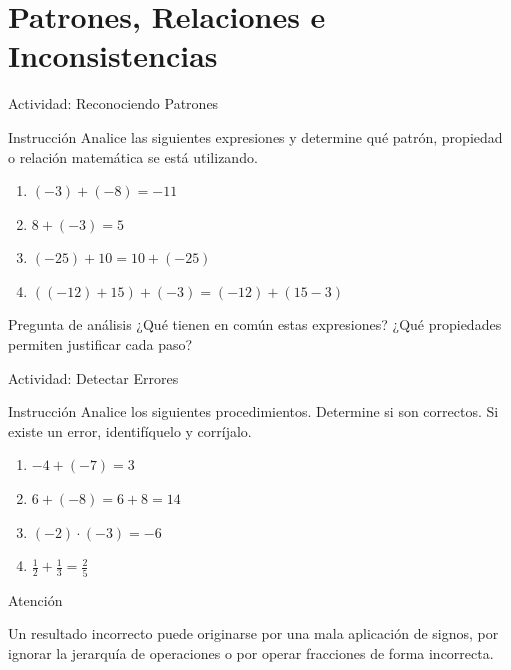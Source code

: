 \documentclass[handout,aspectratio=169,10pt]{beamer}
\newcommand{\AlertaPedagogica}[1]{
	\begin{alertblock}{Atención}
		#1
	\end{alertblock}
}
\begin{document}
	\section{Patrones, Relaciones e Inconsistencias}
	
	\begin{frame}{Actividad: Reconociendo Patrones}
		\begin{block}{Instrucción}
			Analice las siguientes expresiones y determine qué patrón, propiedad o relación matemática se está utilizando.
		\end{block}
		
		\begin{enumerate}[<+->]
			\item \((-3)+(-8)=-11\)
			\item \(8+(-3)=5\)
			\item \((-25)+10=10+(-25)\)
			\item \(((-12)+15)+(-3)=(-12)+(15-3)\)
		\end{enumerate}
		
		\begin{alertblock}{Pregunta de análisis}
			¿Qué tienen en común estas expresiones? ¿Qué propiedades permiten justificar cada paso?
		\end{alertblock}
	\end{frame}
	
	\begin{frame}{Actividad: Detectar Errores}
		\begin{block}{Instrucción}
			Analice los siguientes procedimientos. Determine si son correctos. Si existe un error, identifíquelo y corríjalo.
		\end{block}
		
		\begin{enumerate}[<+->]
			\item \(-4+(-7)=3\)
			\item \(6+(-8)=6+8=14\)
			\item \((-2)\cdot(-3)=-6\)
			\item \(\frac12+\frac13=\frac25\)
		\end{enumerate}
		
		\AlertaPedagogica{
			Un resultado incorrecto puede originarse por una mala aplicación de signos, por ignorar la jerarquía de operaciones o por operar fracciones de forma incorrecta.
		}
	\end{frame}
	
\end{document}
